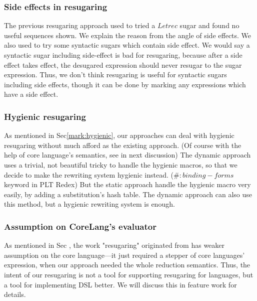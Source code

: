 \subsubsection{Side effects in resugaring}
\label{mark:side}
The previous resugaring approach used to tried a $Letrec$ sugar and found no useful sequences shown. We explain the reason from the angle of side effects. We also used to try some syntactic sugars which contain side effect. We would say a syntactic sugar including side-effect is bad for resugaring, because after a side effect takes effect, the desugared expression should never resugar to the sugar expression. Thus, we don't think resugaring is useful for syntactic sugars  including side effects, though it can be done by marking any expressions which have a side effect.

\subsubsection{Hygienic resugaring}As mentioned in Sec\ref{mark:hygienic}, our approaches can deal with hygienic resugaring without much afford as the existing approach\cite{hygienic}. (Of course with the help of core language's semantics, see in next discussion) The dynamic approach uses a trivial, not beautiful tricky to handle the hygienic macros, so that we decide to make the rewriting system hygienic instead. ($\#:binding-forms$ keyword in PLT Redex) But the static approach handle the hygienic macro very easily, by adding a substitution's hash table. The dynamic approach can also use this method, but a hygienic rewriting system is enough.

\subsubsection{Assumption on CoreLang's evaluator}
\label{mark:assumption} As mentioned in Sec , the work "resugaring" originated from has weaker assumption on the core language---it just required a stepper of core languages' expression, when our approach needed the whole reduction semantics. Thus, the intent of our resugaring is not a tool for supporting resugaring for languages, but a tool for implementing DSL better. We will discuss this in feature work for details.  